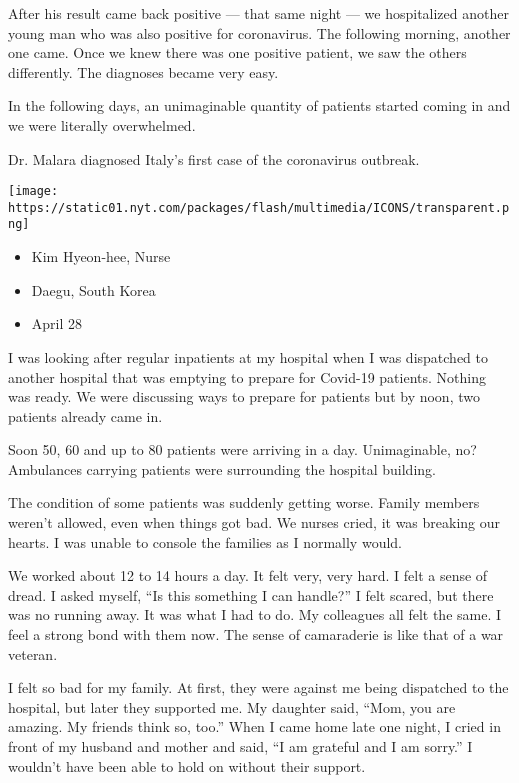 After his result came back positive --- that same night --- we
hospitalized another young man who was also positive for coronavirus.
The following morning, another one came. Once we knew there was one
positive patient, we saw the others differently. The diagnoses became
very easy.

In the following days, an unimaginable quantity of patients started
coming in and we were literally overwhelmed.

Dr. Malara diagnosed Italy's first case of the coronavirus outbreak.

\texttt{[image: https://static01.nyt.com/packages/flash/multimedia/ICONS/transparent.png]}

\begin{itemize}
\tightlist
\item
  Kim Hyeon-hee, Nurse
\item
  Daegu, South Korea
\item
  April 28
\end{itemize}

I was looking after regular inpatients at my hospital when I was
dispatched to another hospital that was emptying to prepare for Covid-19
patients. Nothing was ready. We were discussing ways to prepare for
patients but by noon, two patients already came in.

Soon 50, 60 and up to 80 patients were arriving in a day. Unimaginable,
no? Ambulances carrying patients were surrounding the hospital building.

The condition of some patients was suddenly getting worse. Family
members weren't allowed, even when things got bad. We nurses cried, it
was breaking our hearts. I was unable to console the families as I
normally would.

We worked about 12 to 14 hours a day. It felt very, very hard. I felt a
sense of dread. I asked myself, ``Is this something I can handle?'' I
felt scared, but there was no running away. It was what I had to do. My
colleagues all felt the same. I feel a strong bond with them now. The
sense of camaraderie is like that of a war veteran.

I felt so bad for my family. At first, they were against me being
dispatched to the hospital, but later they supported me. My daughter
said, ``Mom, you are amazing. My friends think so, too.'' When I came
home late one night, I cried in front of my husband and mother and said,
``I am grateful and I am sorry.'' I wouldn't have been able to hold on
without their support.

